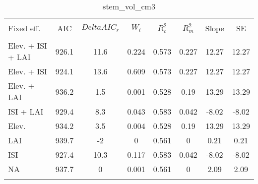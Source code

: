 
\begin{table}[!htbp] \centering 
  \caption{stem_vol_cm3} 
  \label{stem_vol_cm3} 
\begin{tabular}{@{\extracolsep{5pt}} lS[table-format=3.2]S[table-format=3.2]S[table-format=3.2]S[table-format=3.2]S[table-format=3.2]S[table-format=3.2]S[table-format=3.2]} 
\\[-1.8ex]\hline 
\hline \\[-1.8ex] 
{Fixed eff.} & {AIC} & {$Delta{}AIC_r$} & {$W_i$} & {$R^2_c$} & {$R^2_m$} & {Slope} & {SE} \\
\hline \\[-1.8ex] 
Elev. + ISI + LAI & 926.1 & 11.6 & 0.224 & 0.573 & 0.227 & 12.27 & 12.27 \\ 
Elev. + ISI & 924.1 & 13.6 & 0.609 & 0.573 & 0.227 & 12.27 & 12.27 \\ 
Elev. + LAI & 936.2 & 1.5 & 0.001 & 0.528 & 0.19 & 13.29 & 13.29 \\ 
ISI + LAI & 929.4 & 8.3 & 0.043 & 0.583 & 0.042 & -8.02 & -8.02 \\ 
Elev. & 934.2 & 3.5 & 0.004 & 0.528 & 0.19 & 13.29 & 13.29 \\ 
LAI & 939.7 & -2 & 0 & 0.561 & 0 & 0.21 & 0.21 \\ 
ISI & 927.4 & 10.3 & 0.117 & 0.583 & 0.042 & -8.02 & -8.02 \\ 
NA & 937.7 & 0 & 0.001 & 0.561 & 0 & 2.09 & 2.09 \\ 
\hline \\[-1.8ex] 
\end{tabular} 
\end{table} 
